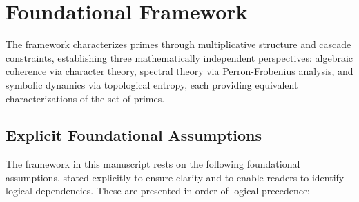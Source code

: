 \section{Foundational Framework}
\label{sec:foundational}

The framework characterizes primes through multiplicative structure and cascade constraints, establishing three mathematically independent perspectives: algebraic coherence via character theory, spectral theory via Perron-Frobenius analysis, and symbolic dynamics via topological entropy, each providing equivalent characterizations of the set of primes.

\subsection{Explicit Foundational Assumptions}
\label{subsec:explicit-assumptions}

The framework in this manuscript rests on the following foundational assumptions, stated explicitly to ensure clarity and to enable readers to identify logical dependencies. These are presented in order of logical precedence:

